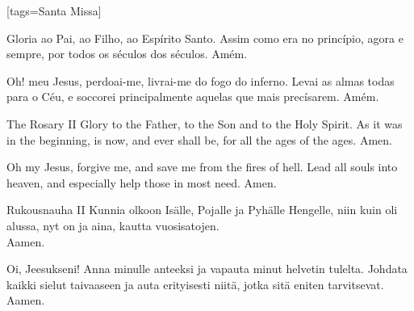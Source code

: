 [tags={Santa Missa}]
  \begin{passage}[PT]{}
    Gloria ao Pai, ao Filho, ao Espírito Santo.
    Assim como era no princípio, agora e sempre,
    por todos os séculos dos séculos. Amém.
    \par
    Oh! meu Jesus, perdoai-me, livrai-me do fogo do
    inferno. Levai as almas todas para o Céu, e soccorei
    principalmente aquelas que mais precísarem. Amém.
  \end{passage}
  \begin{passage}[EN]{The Rosary II}
    Glory to the Father, to the Son and to the Holy Spirit.
    As it was in the beginning, is now, and ever shall be,
    for all the ages of the ages. Amen.
    \par
    Oh my Jesus, forgive me, and save me from the fires
    of hell. Lead all souls into heaven, and especially
    help those in most need. Amen.
  \end{passage}
  \begin{passage}[FI]{Rukousnauha II}
    Kunnia olkoon Isälle, Pojalle ja Pyhälle Hengelle,
    niin kuin oli alussa, nyt on ja aina,
    kautta vuosisatojen.\\
    Aamen.
    \par
    Oi, Jeesukseni! Anna minulle anteeksi ja vapauta
    minut helvetin tulelta. Johdata kaikki
    sielut taivaaseen ja auta erityisesti niitä,
    jotka sitä eniten tarvitsevat. Aamen.
  \end{passage}
\endsong


